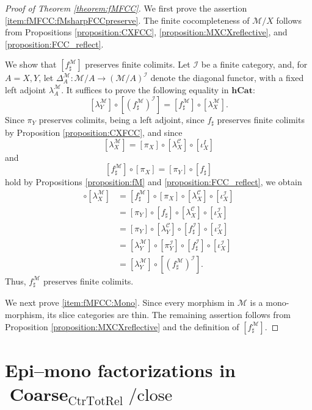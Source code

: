 \documentclass[12pt, a4paper]{amsart}
\theoremstyle{definition}
\newcommand{\Coarse}{\mathop{\mathbf{Coarse}}\nolimits}
\newcommand{\CtrTotRel}{\mathrm{CtrTotRel}}
\newcommand{\close}{\mathrm{close}}
\newcommand{\hCat}{{\mathbf{hCat}}}
\begin{document}
\begin{proof}[Proof of Theorem \ref{theorem:fMFCC}]
We first prove the assertion \eqref{item:fMFCC:fMsharpFCCpreserve}. The finite cocompleteness of $\mathcal{M}/X$ follows from Propositions \ref{proposition:CXFCC}, \ref{proposition:MXCXreflective}, and \ref{proposition:FCC_reflect}.

We show that $[f^\mathcal{M}_\sharp]$ preserves finite colimits. Let $\mathcal{I}$ be a finite category, and, for $A=X,Y$, let $\Delta^{\mathcal{M}}_A : \mathcal{M}/{A} \rightarrow (\mathcal{M}/{A})^\mathcal{I}$ denote the diagonal functor, with a fixed left adjoint $\lambda^\mathcal{M}_A$. It suffices to prove the following equality in $\hCat$:
\[
[\lambda^\mathcal{M}_Y] \circ [(f^\mathcal{M}_\sharp)^\mathcal{I}] = [f^\mathcal{M}_\sharp] \circ [\lambda^\mathcal{M}_X].
\]
Since $\pi_Y$ preserves colimits, being a left adjoint, since $f_\sharp$ preserves finite colimits by Proposition \ref{proposition:CXFCC}, and since
\[
[\lambda_X^\mathcal{M}] = [\pi_X] \circ [\lambda_X^\mathcal{C}] \circ [\iota_X^I]
\]
and
\[
[f^\mathcal{M}_\sharp] \circ [\pi_X] = [\pi_Y] \circ [f_\sharp]
\]
hold by Propositions \ref{proposition:fM} and \ref{proposition:FCC_reflect}, we obtain
\begin{align*}
[f^\mathcal{M}_\sharp] \circ [\lambda^\mathcal{M}_X]
    &= [f^\mathcal{M}_\sharp] \circ [\pi_X] \circ [\lambda^\mathcal{C}_X] \circ [\iota^\mathcal{I}_X] \\
    &= [\pi_Y] \circ [f_\sharp] \circ [\lambda^\mathcal{C}_X] \circ [\iota^\mathcal{I}_X] \\
    &= [\pi_Y] \circ [\lambda^\mathcal{C}_Y] \circ [f_\sharp^\mathcal{I}] \circ [\iota^\mathcal{I}_X] \\
    &= [\lambda^\mathcal{M}_Y] \circ [\pi_Y^{\mathcal{I}}] \circ [f_\sharp^\mathcal{I}] \circ [\iota^\mathcal{I}_X] \\
    &= [\lambda^\mathcal{M}_Y] \circ [(f^\mathcal{M}_\sharp)^\mathcal{I}].
\end{align*}
Thus, $f^\mathcal{M}_\sharp$ preserves finite colimits.

We next prove \eqref{item:fMFCC:Mono}. Since every morphism in $\mathcal{M}$ is a mono-morphism, its slice categories are thin. The remaining assertion follows from Proposition \ref{proposition:MXCXreflective} and the definition of $[f^\mathcal{M}_\sharp]$.
\end{proof}


\section{Epi--mono factorizations in $\Coarse_{\CtrTotRel}/{\close}$}\label{section:EpiMono_factorization}
\end{document}
